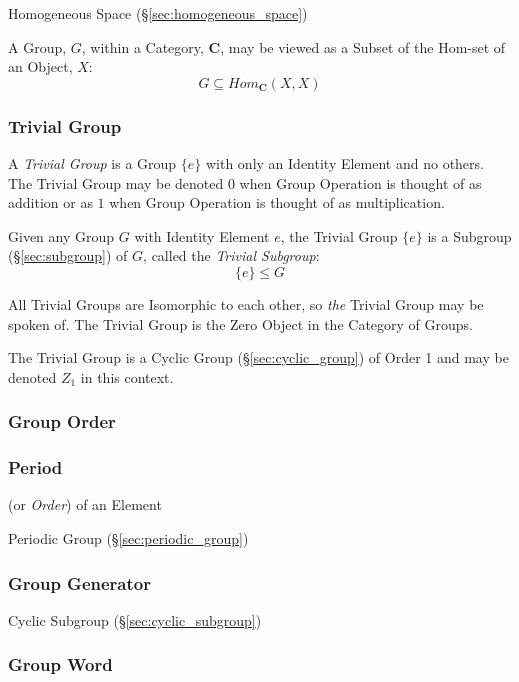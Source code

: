 \fist Homogeneous Space (\S\ref{sec:homogeneous_space})

A Group, $G$, within a Category, $\mathbf{C}$, may be viewed as a
Subset of the Hom-set of an Object, $X$:
\[
    G \subseteq Hom_{\mathbf{C}}(X,X)
\]



\subsubsection{Trivial Group}\label{sec:trivial_group}

A \emph{Trivial Group} is a Group $\{e\}$ with only an Identity
Element and no others. The Trivial Group may be denoted $0$ when
Group Operation is thought of as addition or as $1$ when Group
Operation is thought of as multiplication.

Given any Group $G$ with Identity Element $e$, the Trivial Group
$\{e\}$ is a Subgroup (\S\ref{sec:subgroup}) of $G$, called the
\emph{Trivial Subgroup}:
\[
    \{e\} \leq G
\]

All Trivial Groups are Isomorphic to each other, so \emph{the} Trivial
Group may be spoken of. The Trivial Group is the Zero Object in the
Category of Groups.

The Trivial Group is a Cyclic Group (\S\ref{sec:cyclic_group}) of
Order 1 and may be denoted $Z_1$ in this context.



\subsubsection{Group Order}\label{sec:group_order}

\subsubsection{Period}\label{sec:period}

(or \emph{Order}) of an Element

Periodic Group (\S\ref{sec:periodic_group})



\subsubsection{Group Generator}\label{sec:group_generator}

Cyclic Subgroup (\S\ref{sec:cyclic_subgroup})



\subsubsection{Group Word}\label{sec:group_word}

